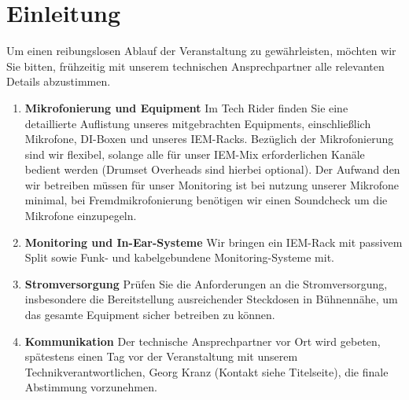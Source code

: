 \section{Einleitung}
Um einen reibungslosen Ablauf der Veranstaltung zu gewährleisten, möchten wir Sie bitten, frühzeitig mit unserem technischen Ansprechpartner alle relevanten Details abzustimmen.

\begin{enumerate}
    \item \textbf{Mikrofonierung und Equipment}  
    Im Tech Rider finden Sie eine detaillierte Auflistung unseres mitgebrachten Equipments, einschließlich Mikrofone, DI-Boxen und unseres IEM-Racks.  
    Bezüglich der Mikrofonierung sind wir flexibel, solange alle für unser IEM-Mix erforderlichen Kanäle bedient werden (Drumset Overheads sind hierbei optional). Der Aufwand den wir betreiben müssen für unser Monitoring ist bei nutzung unserer Mikrofone minimal, bei Fremdmikrofonierung benötigen wir einen Soundcheck um die Mikrofone einzupegeln.

    \item \textbf{Monitoring und In-Ear-Systeme}  
    Wir bringen ein IEM-Rack mit passivem Split sowie Funk- und kabelgebundene Monitoring-Systeme mit.

    \item \textbf{Stromversorgung}  
    Prüfen Sie die Anforderungen an die Stromversorgung, insbesondere die Bereitstellung ausreichender Steckdosen in Bühnennähe, um das gesamte Equipment sicher betreiben zu können.

    \item \textbf{Kommunikation}  
    Der technische Ansprechpartner vor Ort wird gebeten, spätestens einen Tag vor der Veranstaltung mit unserem Technikverantwortlichen, Georg Kranz (Kontakt siehe Titelseite), die finale Abstimmung vorzunehmen.  

\end{enumerate}